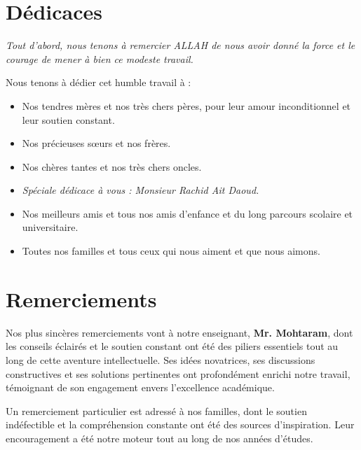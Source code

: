 \documentclass[a4paper,12pt]{report}
\begin{document}

\chapter*{Dédicaces}
\begin{flushleft}
    \emph{Tout d’abord, nous tenons à remercier ALLAH de nous avoir donné la force et le courage de mener à bien ce modeste travail.}
    
    \vspace{1cm}
    Nous tenons à dédier cet humble travail à :
    \begin{itemize}
        \item Nos tendres mères et nos très chers pères, pour leur amour inconditionnel et leur soutien constant.
        \item Nos précieuses sœurs et nos frères.
        \item Nos chères tantes et nos très chers oncles.
        \item \emph{Spéciale dédicace à vous : Monsieur Rachid Ait Daoud.}
        \item Nos meilleurs amis et tous nos amis d’enfance et du long parcours scolaire et universitaire.
        \item Toutes nos familles et tous ceux qui nous aiment et que nous aimons.
    \end{itemize}
\end{flushleft}

\newpage

\chapter*{Remerciements}
Nos plus sincères remerciements vont à notre enseignant, \textbf{Mr. Mohtaram}, dont les conseils éclairés et le soutien constant ont été des piliers essentiels tout au long de cette aventure intellectuelle. Ses idées novatrices, ses discussions constructives et ses solutions pertinentes ont profondément enrichi notre travail, témoignant de son engagement envers l'excellence académique.

Un remerciement particulier est adressé à nos familles, dont le soutien indéfectible et la compréhension constante ont été des sources d'inspiration. Leur encouragement a été notre moteur tout au long de nos années d'études.
\end{document}
